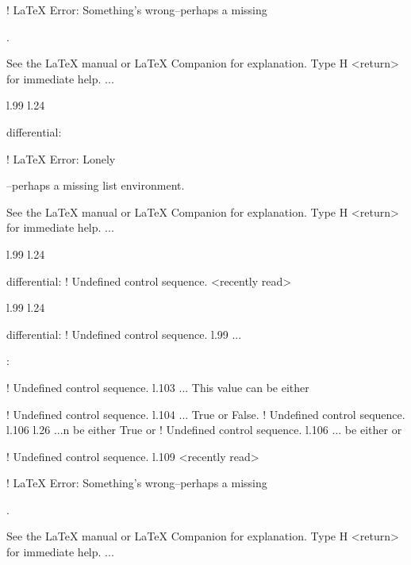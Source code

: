 {{{{{{{{{{{{{{{{{{! LaTeX Error: Something's wrong--perhaps a missing \item.

See the LaTeX manual or LaTeX Companion for explanation.
Type  H <return>  for immediate help.
 ...                                              
                                                  
l.99 l.24     \item \xmlNode
                            {differential}: \xmlDesc

! LaTeX Error: Lonely \item--perhaps a missing list environment.

See the LaTeX manual or LaTeX Companion for explanation.
Type  H <return>  for immediate help.
 ...                                              
                                                  
l.99 l.24     \item \xmlNode
                            {differential}: \xmlDesc
! Undefined control sequence.
<recently read> \xmlNode 
                         
l.99 l.24     \item \xmlNode
                            {differential}: \xmlDesc
! Undefined control sequence.
l.99 ...    \item {}: \xmlDesc
                                                  
! Undefined control sequence.
l.103 ...      This value can be either \xmlString
                                                  
! Undefined control sequence.
l.104 ...                     {True} or \xmlString
                                                  {False}.
! Undefined control sequence.
l.106 l.26 ...n be either \xmlString
                                    {True} or \xmlString
! Undefined control sequence.
l.106 ... be either  or \xmlString
                                                  
! Undefined control sequence.
l.109 <recently read> \xmlNode
                              

! LaTeX Error: Something's wrong--perhaps a missing \item.

See the LaTeX manual or LaTeX Companion for explanation.
Type  H <return>  for immediate help.
 ...                                              
                                                  
}}}}}}}}}}}}}}}}}}
